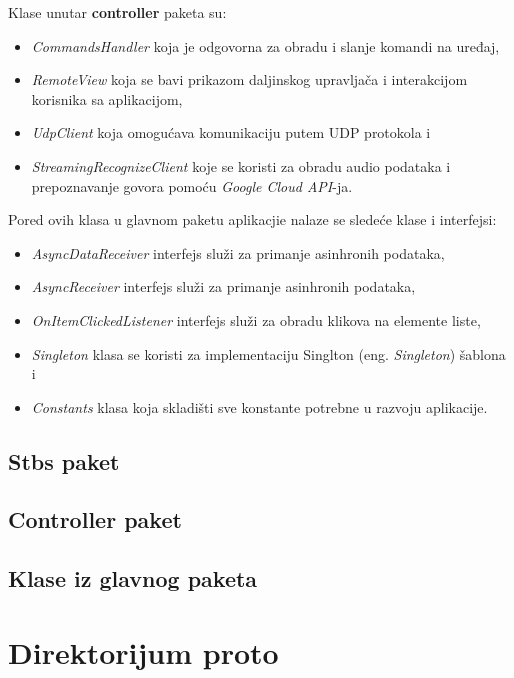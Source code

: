 \documentclass[implementacija.tex]{subfiles}
\begin{document}
Klase unutar \textbf{controller} paketa su:
\begin{itemize}
\item \textit{CommandsHandler} koja je odgovorna za obradu i slanje komandi na uređaj,
\item \textit{RemoteView} koja se bavi prikazom daljinskog upravljača i interakcijom korisnika sa aplikacijom,
\item \textit{UdpClient} koja omogućava komunikaciju putem UDP protokola i
\item \textit{StreamingRecognizeClient} koje se koristi za obradu audio podataka i prepoznavanje govora pomoću \textit{Google Cloud API}-ja. 
\end{itemize}


Pored ovih klasa u glavnom paketu aplikacjie nalaze se sledeće klase i interfejsi:
\begin{itemize}
\item \textit{AsyncDataReceiver} interfejs služi za primanje asinhronih podataka,
\item \textit{AsyncReceiver} interfejs služi za primanje asinhronih podataka,
\item \textit{OnItemClickedListener} interfejs služi za obradu klikova na elemente liste,
\item \textit{Singleton} klasa se koristi za implementaciju Singlton (eng. \textit{Singleton}) šablona i
\item \textit{Constants} klasa koja skladišti sve konstante potrebne u razvoju aplikacije.
\end{itemize}

\subsection{Stbs paket}


\subsection{Controller paket}


\subsection{Klase iz glavnog paketa}

\section{Direktorijum proto}



\end{document}
